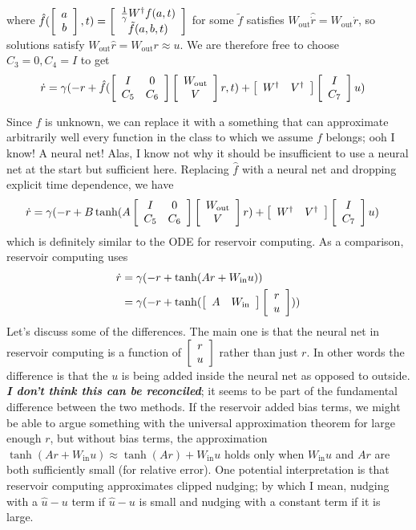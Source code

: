 \documentclass{article}
\newcommand{\mat}[2]{
    \IfInteger{#1}{
        \left[\begin{array}{*{#1}c} #2 \end{array}\right]
    }{
        \left[\begin{array}{#1} #2 \end{array}\right]}
    }
\newcommand{\Wout}{W_{\text{out}}}
\newcommand{\Win}{W_{\text{in}}}
\begin{document}
where $\hat f(\mat{2}{a\\b}, t) = \mat{2}{\frac{1}{\gamma} W^\dagger f(a, t) \\ \tilde f(a, b, t)}$ for some $\tilde f$ satisfies $\Wout \hat {\dot r} = \Wout \dot r$, so solutions satisfy $\Wout \hat r = \Wout r \approx u$. We are therefore free to choose $C_3 = 0, C_4 = I$ to get 
\begin{align*}
    \dot r &= \gamma (- r + \hat f(\mat{2}{I & 0 \\ C_5 & C_6}\mat{1}{\Wout\\V} r, t) +  \mat{2}{W^\dagger & V^\dagger} \mat{1}{I \\ C_7}u)
\end{align*}


Since $f$ is unknown, we can replace it with a something that can approximate arbitrarily well every function in the class to which we assume $f$ belongs; ooh I know! A neural net! Alas, I  know not why it should be insufficient to use a neural net at the start but sufficient here. Replacing $\hat f$ with a neural net and dropping explicit time dependence, we have
\begin{align*}
    \dot r &= \gamma (- r + B\tanh(A\mat{2}{I & 0 \\ C_5 & C_6}\mat{1}{\Wout\\V} r) +  \mat{2}{W^\dagger & V^\dagger} \mat{1}{I \\ C_7}u)
\end{align*}
which is definitely similar to the ODE for reservoir computing. As a comparison, reservoir computing uses
\begin{align*}
    \dot r &= \gamma (-r + \tanh(Ar + \Win u))
    \\
    &= \gamma (-r + \tanh(\mat{2}{A & \Win}\mat{1}{r \\  u}))
\end{align*}
Let's discuss some of the differences. The main one is that the neural net in reservoir computing is a function of $\mat{1}{r \\ u}$ rather than just $r$. In other words the difference is that the $u$ is being added inside the neural net as opposed to outside. \textbf{\textit{I don't think this can be reconciled}}; it seems to be part of the fundamental difference between the two methods. If the reservoir added bias terms, we might be able to argue something with the universal approximation theorem for large enough $r$, but without bias terms, the approximation $\tanh (Ar + \Win u) \approx \tanh (Ar) + \Win u$ holds only when $\Win u$ and $Ar$ are both sufficiently small (for relative error). One potential interpretation is that reservoir computing approximates clipped nudging; by which I mean, nudging with a $\hat u - u$ term if $\hat u - u$ is small and nudging with a constant term if it is large. 
\end{document}
